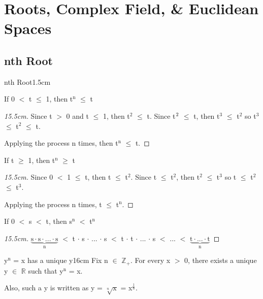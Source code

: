 \newpage

\section[Day 2: Complex Field \& Euclidean Spaces]
{ Roots, Complex Field, \& Euclidean Spaces }

\subsection{ nth Root }

	\begin{ltheorem}{nth Root}{1.5cm}
		\item If 0 $<$ t $\leq$ 1, then t$^\text{n}$ $ \leq $ t
		
			\begin{proof}[15.5cm]
				Since t $>$ 0 and t $\leq$ 1, then t$^\text{2}$ $\leq$ t.
				Since t$^\text2{}$ $\leq$ t, then t$^\text{3}$ $\leq$ t$^\text{2}$
				so t$^\text{3}$ $\leq$ t$^\text{2}$ $\leq$ t.

				Applying the process n times, then t$^\text{n}$ $\leq$ t.
			\end{proof}

		\item If t $\geq$ 1, then t$^\text{n}$ $ \geq $ t

			\begin{proof}[15.5cm]
				Since 0 $<$ 1 $\leq$ t, then t $\leq$ t$^\text{2}$.
				Since t $\leq$ t$^\text{2}$, then t$^\text{2}$ $\leq$ t$^\text{3}$
				so t $\leq$ t$^\text{2}$ $\leq$ t$^\text{3}$.

				Applying the process n times, t $\leq$ t$^\text{n}$.
			\end{proof}

		\item If 0 $<$ s $<$ t, then s$^\text{n}$ $<$ t$^\text{n}$

			\begin{proof}[15.5cm]
				$\underbrace{\text{s} \cdot \text{s} \cdot
								... \cdot \text{s}}_\text{n}$
				$<$ t $\cdot$ s $\cdot$ ... $\cdot$ s
				$<$ t $\cdot$ t $\cdot$ ... $\cdot$ s $<$ ... $<$
				$\underbrace{\text{t} \cdot ... \cdot \text{t}}_\text{n}$
			\end{proof}
	\end{ltheorem}

	\vspace{0.5cm}



	\begin{wtheorem}{y$^\text{n}$ = x has a unique y}{16cm}
		Fix n $\in$ $\mathbb{Z}_+$. For every x $>$ 0, there exists a unique y
		$\in$ $ \mathbb{R} $ such that y$^\text{n}$ = x.

		Also, such a y is written as y = $\sqrt[n]{\text{x}}$
		= x$^{\frac{1}{\text{n}}}$.		
	\end{wtheorem}
	

